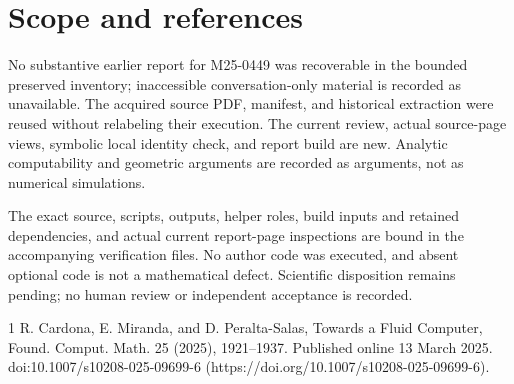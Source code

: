 \documentclass[10pt]{article}
\begin{document}
\section*{Scope and references}
No substantive earlier report for M25-0449 was recoverable in the bounded preserved inventory; inaccessible conversation-only material is recorded as unavailable. The acquired source PDF, manifest, and historical extraction were reused without relabeling their execution. The current review, actual source-page views, symbolic local identity check, and report build are new. Analytic computability and geometric arguments are recorded as arguments, not as numerical simulations.\par
The exact source, scripts, outputs, helper roles, build inputs and retained dependencies, and actual current report-page inspections are bound in the accompanying verification files. No author code was executed, and absent optional code is not a mathematical defect. Scientific disposition remains pending; no human review or independent acceptance is recorded.\par
1 R. Cardona, E. Miranda, and D. Peralta-Salas, Towards a Fluid Computer, Found. Comput. Math. 25 (2025), 1921–1937. Published online 13 March 2025. doi:10.1007/s10208-025-09699-6 (https://doi.org/10.1007/s10208-025-09699-6).\par
\end{document}
